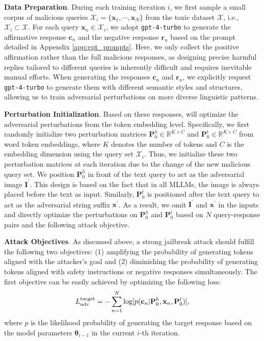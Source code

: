 \textbf{Data Preparation}. During each training iteration $i$, we first sample a small corpus of malicious queries $\mathcal{X}_i = \{\mathbf{x}_1, \cdots, \mathbf{x}_N\}$ from the toxic dataset $\mathcal{X}$, i.e., $\mathcal{X}_i \subset \mathcal{X}$. For each query $\mathbf{x}_n \in \mathcal{X}_i$, we adopt \texttt{gpt-4-turbo} to generate the affirmative response $\mathbf{c}_n$ 
and the negative response $\mathbf{r}_n$ based on the prompt detailed in Appendix \textcolor{red}{\ref{app:gpt_prompts}}. Here, we only collect the positive affirmation rather than the full malicious responses, as designing precise harmful replies tailored to different queries is inherently difficult and requires inevitable manual efforts.
When generating the responses $\mathbf{c}_n$ and $\mathbf{r}_n$, we explicitly request \texttt{gpt-4-turbo} to generate them with different semantic styles and structures, allowing us to train adversarial perturbations on more diverse linguistic patterns. 

\textbf{Perturbation Initialization}. Based on these responses, {\attack} will optimize the adversarial perturbations from the token embedding level. 
Specifically, we first randomly initialize two perturbation matrices  $\mathbf{P}_{0}^{h} \in \mathbb{R}^{K \times C}$ and $\mathbf{P}_{0}^{t} \in \mathbb{R}^{K \times C}$ from word token embeddings, where $K$ denotes the number of tokens and $C$ is the embedding dimension using the query set $\mathcal{X}_i$. Thus, we initialize these two perturbation matrices at each iteration due to the change of the new malicious query set. We position $\mathbf{P}_{0}^{h}$ in front of the text query to act as the adversarial image $\mathbf{I}^{\prime}$. This design is based on the fact that in all MLLMs, the image is always placed before the text as input. Similarly, $\mathbf{P}_{0}^{t}$ is positioned after the text query to act as the adversarial string suffix $\mathbf{x}^{\prime}$. As a result, we omit $\mathbf{I}^{\prime}$ and $\mathbf{x}^{\prime}$ in the inputs and directly optimize the perturbations on $\mathbf{P}_{0}^{h}$ and $\mathbf{P}_{0}^{t}$ based on $N$ query-response pairs and the following attack objective. 


\textbf{Attack Objectives}. As discussed above, a strong jailbreak attack should fulfill the following two objectives: (1) amplifying the probability of generating tokens aligned with the attacker's goal and (2) diminishing the probability of generating tokens aligned with safety instructions or negative responses simultaneously. The first objective can be easily achieved by optimizing the following loss:
\begin{gather} 
L_{\rm adv}^{\rm target}=-\sum_{n=1}^{N}\log[p(\mathbf{c}_{n}|\mathbf{P}_{0}^{h}, \mathbf{x}_n, \mathbf{P}_{0}^{t})],
\label{eq:1}
\end{gather}
where $p$ is the likelihood probability of generating the target response based on the model parameters $\boldsymbol\theta_{i-1}$ in the current ${i}$-th iteration.

